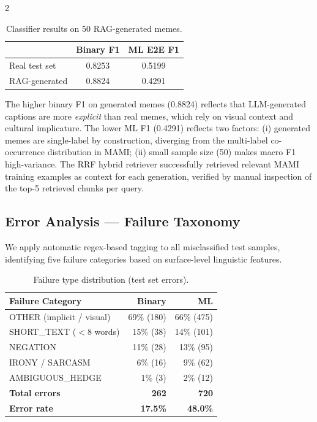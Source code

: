 \documentclass[11pt]{article}
\begin{document}
\begin{multicols}{2}
\begin{table}[h]
\small
\centering
\caption{Classifier results on 50 RAG-generated memes.}
\begin{tabular}{lcc}
\toprule
& \textbf{Binary F1} & \textbf{ML E2E F1} \\
\midrule
Real test set & 0.8253 & 0.5199 \\
RAG-generated & 0.8824 & 0.4291 \\
\bottomrule
\end{tabular}
\end{table}

The higher binary F1 on generated memes (0.8824) reflects that LLM-generated captions are more \textit{explicit} than real memes, which rely on visual context and cultural implicature. The lower ML F1 (0.4291) reflects two factors: (i) generated memes are single-label by construction, diverging from the multi-label co-occurrence distribution in MAMI; (ii) small sample size (50) makes macro F1 high-variance. The RRF hybrid retriever successfully retrieved relevant MAMI training examples as context for each generation, verified by manual inspection of the top-5 retrieved chunks per query.

\subsection{Error Analysis — Failure Taxonomy}

We apply automatic regex-based tagging to all misclassified test samples, identifying five failure categories based on surface-level linguistic features.

\begin{table}[h]
\small
\centering
\caption{Failure type distribution (test set errors).}
\begin{tabular}{lrr}
\toprule
\textbf{Failure Category} & \textbf{Binary} & \textbf{ML} \\
\midrule
OTHER (implicit / visual) & 69\% (180) & 66\% (475) \\
SHORT\_TEXT ($<$8 words)   & 15\% (38)  & 14\% (101) \\
NEGATION                   & 11\% (28)  & 13\% (95)  \\
IRONY / SARCASM            & 6\% (16)   & 9\% (62)   \\
AMBIGUOUS\_HEDGE           & 1\% (3)    & 2\% (12)   \\
\midrule
\textbf{Total errors}      & \textbf{262} & \textbf{720} \\
\textbf{Error rate}        & \textbf{17.5\%} & \textbf{48.0\%} \\
\bottomrule
\end{tabular}
\end{table}


\end{multicols}
\end{document}
